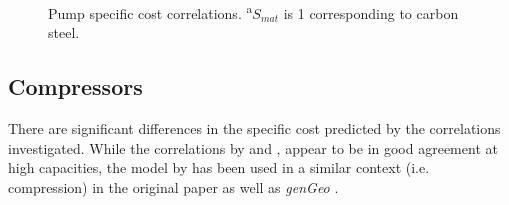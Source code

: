         \begin{table}[H]
            \caption[Cost correlations for pumps.]{Cost correlations for pumps. \(\Dot{W}\) is the pump power in \unit{\kilo\watt}.}
            \centering 
            \label{table:PumpCosts}
            \scalebox{0.8}{
                
            }
        \end{table}


        \begin{figure}[H]
            \centering
            
            \caption[Pump specific cost correlations.]{Pump specific cost correlations. \textsuperscript{a}\(S_{mat}\) is \num{1} corresponding to carbon steel.}
            \label{fig:prosim_litrev_Pump_speccost}
        \end{figure}

    \subsection{Compressors}
        There are significant differences in the specific cost predicted by the correlations investigated. While the correlations by \citeauthor{Turton2012} \cite{Turton2012} and \citeauthor{Smith2005} \cite{Smith2005}, appear to be in good agreement at high capacities, the model by \citeauthor{Duc2007} \cite{Duc2007} has been used in a similar context (i.e.  compression) in the original paper as well as \emph{genGeo} \cite{Adams2021}.
    
        \begin{table}[H]
            \caption[Cost correlations for compressors.]{Cost correlations for compressors.\(\Dot{W}\) is the fan power in \unit{\kilo\watt}.}
            \centering 
            \label{table:CompressorsCosts}
            \scalebox{0.8}{
                
            }
            \\[10pt]
        \end{table}

